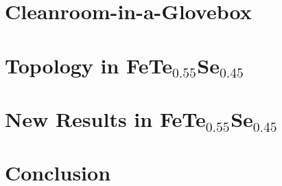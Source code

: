 \documentclass[reqno,12pt,oneside]{report} %
\theoremstyle{plain}
\theoremstyle{definition}
\theoremstyle{remark}
\numberwithin{theorem}{chapter}     %
\begin{document}
\chapter{Cleanroom-in-a-Glovebox}
\label{chap:chap2}
 
 
\chapter{Topology in FeTe\texorpdfstring{$_{0.55}$}{0.55}Se\texorpdfstring{$_{0.45}$}{0.45}}
\label{chap:CRAIG}

 
\chapter{New Results in FeTe\texorpdfstring{$_{0.55}$}{0.55}Se\texorpdfstring{$_{0.45}$}{0.45}}
\label{chap:PAR}

 
\chapter{Conclusion}
\label{chap:conclusion}


\startappendices
{}
\label{app:ARfit}

 
\label{app:Circuit}


\startbibliography
\begin{singlespace}
    \printbibliography[heading = none]
\end{singlespace}
\end{document}
